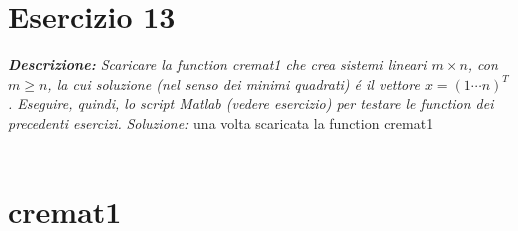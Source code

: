 \section{Esercizio 13}
\textit{\textbf{Descrizione:} Scaricare la function cremat1 che crea sistemi lineari $m \times n$, con $m \geq n$, la cui soluzione (nel senso dei minimi quadrati) \'e il vettore $x = (1 \cdots n)^{T}$. Eseguire, quindi, lo script Matlab (vedere esercizio) per testare le function dei precedenti esercizi.}\newline
\noindent\emph{Soluzione: }\newline
una volta scaricata la function cremat1
\\~\\

\section*{cremat1}

\newpage

